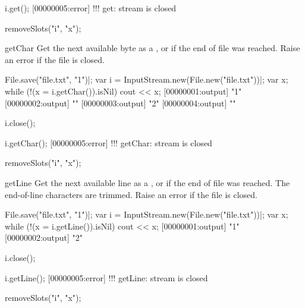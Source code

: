 \begin{urbiscriptapi}
\begin{urbiscript}
i.get();
[00000005:error] !!! get: stream is closed
\end{urbiscript}
\begin{urbicomment}
removeSlots("i", "x");
\end{urbicomment}


\item[getChar]%
  Get the next available byte as a , or 
  if the end of file was reached.  Raise an error if the file is closed.
\begin{urbiscript}
File.save("file.txt", "1\n")|;
var i = InputStream.new(File.new("file.txt"))|;
var x;
while (!(x = i.getChar()).isNil)
  cout << x;
[00000001:output] "1"
[00000002:output] "\n"
[00000003:output] "2"
[00000004:output] "\n"

i.close();

i.getChar();
[00000005:error] !!! getChar: stream is closed
\end{urbiscript}
\begin{urbicomment}
removeSlots("i", "x");
\end{urbicomment}


\item[getLine]%
  Get the next available line as a , or  if
  the end of file was reached.  The end-of-line characters are trimmed.
  Raise an error if the file is closed.
\begin{urbiscript}
File.save("file.txt", "1\n")|;
var i = InputStream.new(File.new("file.txt"))|;
var x;
while (!(x = i.getLine()).isNil)
  cout << x;
[00000001:output] "1"
[00000002:output] "2"

i.close();

i.getLine();
[00000005:error] !!! getLine: stream is closed
\end{urbiscript}
\begin{urbicomment}
removeSlots("i", "x");
\end{urbicomment}
\end{urbiscriptapi}


